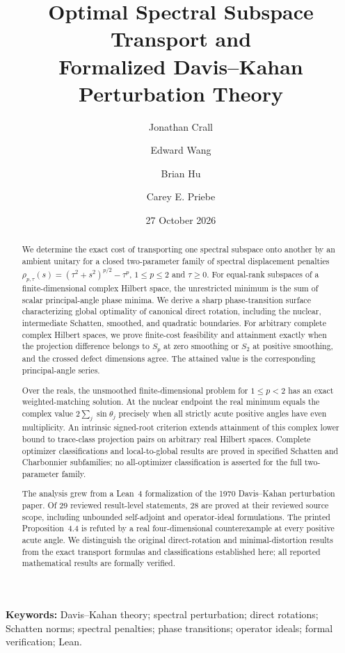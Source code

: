 \documentclass[11pt]{article}
\title{Optimal Spectral Subspace Transport and\\Formalized Davis--Kahan Perturbation Theory}
\author[1]{Jonathan Crall}
\author[2]{Edward Wang}
\author[1]{Brian Hu}
\author[2]{Carey E. Priebe}
\affil[1]{%
  Kitware, Inc.\\
  \texttt{jon.crall@kitware.com},
  \texttt{brian.hu@kitware.com}
}
\affil[2]{%
  Johns Hopkins University\\
  \texttt{ewang43@jhu.edu},
  \texttt{cep@jhu.edu}
}
\date{27 October 2026}
\begin{document}
\maketitle

\begin{abstract}
We determine the exact cost of transporting one spectral subspace onto
another by an ambient unitary for a closed two-parameter family of
spectral displacement penalties
$\rho_{p,\tau}(s)=(\tau^2+s^2)^{p/2}-\tau^p$,
$1\le p\le2$ and $\tau\ge0$. For equal-rank subspaces of a finite-dimensional
complex Hilbert space, the unrestricted minimum is the sum of scalar
principal-angle phase minima. We derive a sharp phase-transition surface
characterizing global optimality of canonical direct rotation, including
the nuclear, intermediate Schatten, smoothed, and quadratic boundaries.
For arbitrary complete complex Hilbert spaces, we prove finite-cost
feasibility and attainment exactly when the projection difference belongs
to $S_p$ at zero smoothing or $S_2$ at positive smoothing, and the crossed
defect dimensions agree. The attained value is the corresponding
principal-angle series.

Over the reals, the unsmoothed finite-dimensional problem for
$1\le p<2$ has an exact weighted-matching solution. At the nuclear
endpoint the real minimum equals the complex value
$2\sum_j\sin\theta_j$ precisely when all strictly acute positive angles
have even multiplicity. An intrinsic signed-root criterion extends
attainment of this complex lower bound to trace-class projection pairs
on arbitrary real Hilbert spaces. Complete optimizer classifications
and local-to-global results are proved in specified Schatten and
Charbonnier subfamilies; no all-optimizer classification is asserted for
the full two-parameter family.

The analysis grew from a Lean~4 formalization of the 1970 Davis--Kahan
perturbation paper. Of 29 reviewed result-level statements, 28 are proved
at their reviewed source scope, including unbounded self-adjoint and
operator-ideal formulations. The printed Proposition~4.4 is refuted by a
real four-dimensional counterexample at every positive acute angle.
We distinguish the original direct-rotation and minimal-distortion
results from the exact transport formulas and classifications established
here; all reported mathematical results are formally verified.
\end{abstract}

\noindent\textbf{Keywords:} Davis--Kahan theory; spectral perturbation;
direct rotations; Schatten norms; spectral penalties; phase transitions; operator ideals; formal verification; Lean.
\end{document}
